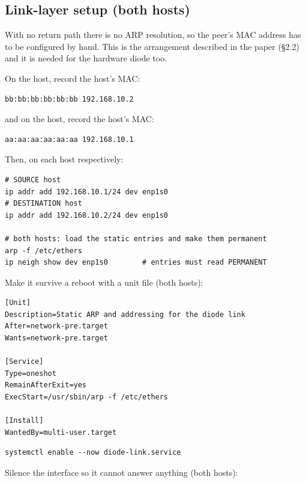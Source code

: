 \documentclass[11pt,a4paper]{article}
\begin{document}
\subsection{Link-layer setup (both hosts)}

With no return path there is no ARP resolution, so the peer's MAC address has
to be configured by hand. This is the arrangement described in the paper
(\S2.2) and it is needed for the hardware diode too.

On the \srcside{} host, record the \dstside{} host's MAC:

\begin{lstlisting}[style=conf,caption={\file{/etc/ethers} on the SOURCE host}]
bb:bb:bb:bb:bb:bb 192.168.10.2
\end{lstlisting}

and on the \dstside{} host, record the \srcside{} host's MAC:

\begin{lstlisting}[style=conf,caption={\file{/etc/ethers} on the DESTINATION host}]
aa:aa:aa:aa:aa:aa 192.168.10.1
\end{lstlisting}

Then, on each host respectively:

\begin{lstlisting}[style=shell]
# SOURCE host
ip addr add 192.168.10.1/24 dev enp1s0
# DESTINATION host
ip addr add 192.168.10.2/24 dev enp1s0

# both hosts: load the static entries and make them permanent
arp -f /etc/ethers
ip neigh show dev enp1s0        # entries must read PERMANENT
\end{lstlisting}

Make it survive a reboot with a unit file (both hosts):

\begin{lstlisting}[style=conf,caption={\file{/etc/systemd/system/diode-link.service}}]
[Unit]
Description=Static ARP and addressing for the diode link
After=network-pre.target
Wants=network-pre.target

[Service]
Type=oneshot
RemainAfterExit=yes
ExecStart=/usr/sbin/arp -f /etc/ethers

[Install]
WantedBy=multi-user.target
\end{lstlisting}

\begin{lstlisting}[style=shell]
systemctl enable --now diode-link.service
\end{lstlisting}

Silence the interface so it cannot answer anything (both hosts):
\end{document}
